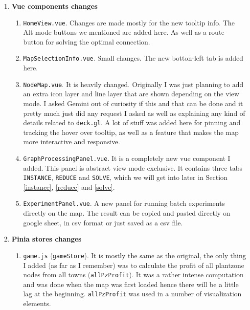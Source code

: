 \documentclass[11pt]{article}
\theoremstyle{definition}
\theoremstyle{remark}
\begin{document}
\begin{enumerate}
    \item[$\bullet$] \textbf{Vue components changes} 
    \begin{enumerate}
        \item[$\circ$] \texttt{HomeView.vue}. Changes are made mostly for the new tooltip info. The Alt mode buttons we mentioned are added here. As well as a route button for solving the optimal connection.

        \item[$\circ$] \texttt{MapSelectionInfo.vue}. Small changes. The new botton-left tab is added here.

        \item[$\circ$] \texttt{NodeMap.vue}. It is heavily changed. Originally I was just planning to add an extra icon layer and line layer that are shown depending on the view mode. I asked Gemini out of curiosity if this and that can be done and it pretty much just did any request I asked as well as explaining any kind of details related to \texttt{deck.gl}. A lot of stuff was added here for pinning and tracking the hover over tooltip, as well as a feature that makes the map more interactive and responsive.

        \item[$\circ$] \texttt{GraphProcessingPanel.vue}. It is a completely new vue component I added. This panel is abstract view mode exclusive. It contains three tabs \texttt{INSTANCE}, \texttt{REDUCE} and \texttt{SOLVE}, which we will get into later in Section \ref{instance}, \ref{reduce} and \ref{solve}.

        \item[$\circ$] \texttt{ExperimentPanel.vue}. A new panel for running batch experiments directly on the map. The result can be copied and pasted directly on google sheet, in csv format or just saved as a csv file.
    \end{enumerate}

    \item[$\bullet$] \textbf{Pinia stores changes} 
    \begin{enumerate}
        \item[$\circ$] \texttt{game.js} (\texttt{gameStore}). It is mostly the same as the original, the only thing I added (as far as I remember) was to calculate the profit of all plantzone nodes from all towns (\texttt{allPzProfit}). It was a rather intense computation and was done when the map was first loaded hence there will be a little lag at the beginning. \texttt{allPzProfit} was used in a number of visualization elements.


\end{enumerate}
\end{enumerate}
\end{document}

